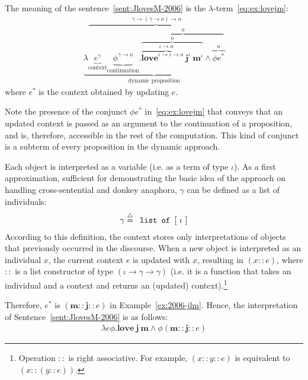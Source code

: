 \begin{example} \label{ex:2006-jlm} The meaning of the sentence~\eqref{sent:JlovesM-2006} is the $\lambda$-term~\eqref{eq:ex:lovejm}:
\begin{align}
\underbrace{\lambda \overbrace{\underbrace{e^{\gamma}}_{\text{context}} \underbrace{\phi^{\gamma \rightarrow o}}_{\text{continuation}}.  \overbrace{\overbrace{ \overbrace{\textbf{love}^{\iota \rightarrow \iota \rightarrow o}  \ \textbf{j}^{\iota}}^{\iota \rightarrow o} \ \textbf{m}^{\iota}}^{o} \land \overbrace{\phi e^*}^{o}}^{o}}^{\gamma \rightarrow (\gamma \rightarrow o) \rightarrow o} }_{\text{dynamic proposition}} \label{eq:ex:lovejm}
\end{align}
where  $e^*$ is the context obtained by updating $e$.
\end{example}

Note the presence of the conjunct $\phi e^*$ in~\eqref{eq:ex:lovejm} that conveys that an updated context is passed as an argument to the continuation of a proposition, and is, therefore, accessible in the rest of the computation.  This kind of conjunct is a subterm of every proposition in the dynamic approach.

Each object is interpreted as a variable (i.e. as a term of type $\iota$).  As a first approximation, sufficient for demonstrating the basic idea of the approach on handling cross-sentential and donkey anaphora,  $\gamma$ can be defined as a list of individuals:
\begin{align}
\gamma \stackrel{{\scriptstyle\triangle}}{=} \texttt{ list of } [ \ \iota \ ] 
\end{align}
According to this definition, the context stores only interpretations of objects that previously occurred in the discourse. When a new object is interpreted as an individual $x$, the current context $e$ is updated with $x$, resulting in $(x::e)$, where $::$ is a list constructor of type $(\iota \rightarrow \gamma \rightarrow \gamma)$ (i.e. it is a function that takes an individual and a context and returns an (updated) context).\footnote{Operation $::$ is right associative. For example, $(x::y::e)$ is equivalent to $(x::(y::e))$.}

Therefore, $e^*$ is $(\textbf{m} :: \textbf{j} ::{e})$ in Example~\ref{ex:2006-jlm}. Hence, the interpretation of Sentence~\eqref{sent:JlovesM-2006} is as follows:
\begin{align}
\lambda e \phi. \textbf{love}  \ \textbf{j} \ \textbf{m} \land \phi (\textbf{m} :: \textbf{j} ::{e}) \label{eq:ex:lovejm-2}
\end{align}

